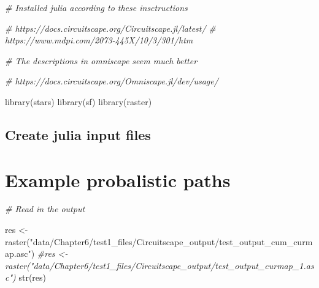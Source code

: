 \documentclass[
]{book}
\newenvironment{Shaded}{\begin{snugshade}}{\end{snugshade}}
\newcommand{\CommentTok}[1]{\textcolor[rgb]{0.56,0.35,0.01}{\textit{#1}}}
\newcommand{\FunctionTok}[1]{\textcolor[rgb]{0.00,0.00,0.00}{#1}}
\newcommand{\NormalTok}[1]{#1}
\newcommand{\OtherTok}[1]{\textcolor[rgb]{0.56,0.35,0.01}{#1}}
\newcommand{\StringTok}[1]{\textcolor[rgb]{0.31,0.60,0.02}{#1}}
\begin{document}
\begin{Shaded}
\begin{Highlighting}[]
\CommentTok{\# Installed julia according to these insctructions}


\CommentTok{\# https://docs.circuitscape.org/Circuitscape.jl/latest/}
\CommentTok{\# https://www.mdpi.com/2073{-}445X/10/3/301/htm}


\CommentTok{\# The descriptions in omniscape seem much better}

\CommentTok{\# https://docs.circuitscape.org/Omniscape.jl/dev/usage/}

\FunctionTok{library}\NormalTok{(stars)}
\FunctionTok{library}\NormalTok{(sf)}
\FunctionTok{library}\NormalTok{(raster)}
\end{Highlighting}
\end{Shaded}

\hypertarget{create-julia-input-files}{%
\subsection{Create julia input files}\label{create-julia-input-files}}

\hypertarget{example-probalistic-paths}{%
\section{Example probalistic paths}\label{example-probalistic-paths}}

\begin{Shaded}
\begin{Highlighting}[]
\CommentTok{\# Read in the output}

\NormalTok{res }\OtherTok{\textless{}{-}} \FunctionTok{raster}\NormalTok{(}\StringTok{"data/Chapter6/test1\_files/Circuitscape\_output/test\_output\_cum\_curmap.asc"}\NormalTok{)}
\CommentTok{\#res \textless{}{-} raster("data/Chapter6/test1\_files/Circuitscape\_output/test\_output\_curmap\_1.asc")}
\FunctionTok{str}\NormalTok{(res)}
\end{Highlighting}
\end{Shaded}
\end{document}
